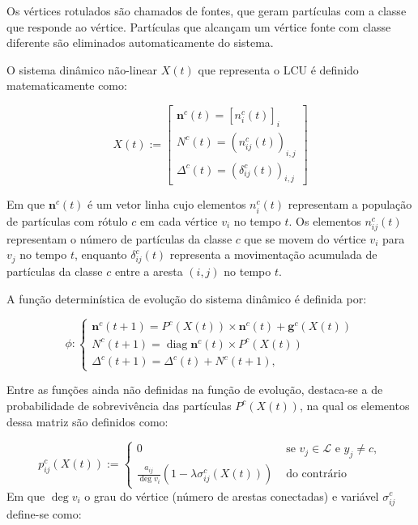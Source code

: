 Os vértices rotulados são chamados de fontes, que geram partículas com
a classe que responde ao vértice. Partículas que alcançam um vértice fonte
com classe diferente são eliminados automaticamente do sistema.

O sistema dinâmico não-linear $X(t)$ que representa o \gls{LCU} é definido
matematicamente como:

\begin{equation}\label{eq:lcu-x}
  X(t):=\left[\begin{array}{c}
    \mathbf{n}^c(t)={\left[n_i^c(t)\right]}_i \\
    N^c(t)={\left(n_{i j}^c(t)\right)}_{i, j} \\
    \Delta^c(t)={\left(\delta_{i j}^c(t)\right)}_{i, j}
\end{array}\right]
\end{equation}

\noindent
Em que $ \mathbf{n}^c(t)$ é um vetor linha cujo elementos $n_i^c(t)$
representam a população de partículas com rótulo $c$ em cada vértice
$v_i$ no tempo $t$. Os elementos $n_{i j}^c(t)$ representam o número
de partículas da classe $c$ que se movem do vértice $v_i$ para $v_j$ no
tempo $ t $, enquanto $\delta_{i j}^c(t)$ representa a movimentação
acumulada de partículas da classe $c$ entre a aresta $(i, j)$ no tempo
$t$.

A função determinística de evolução do sistema dinâmico é definida
por:

\begin{equation}\label{eq:lcu-phi-evolution}
  \phi:\left\{\begin{array}{l}
    \mathbf{n}^c(t+1)= P^c(X(t)) \times \mathbf{n}^c(t) +\mathbf{g}^c(X(t)) \\
    N^c(t+1)=\operatorname{diag} \mathbf{n}^c(t) \times P^c(X(t)) \\
    \Delta^c(t+1)=\Delta^c(t)+N^c(t+1),
  \end{array}\right.
\end{equation}

Entre as funções ainda não definidas na função de evolução, destaca-se a de
probabilidade de sobrevivência das partículas $P^c(X(t))$, na qual os
elementos dessa matriz são definidos como:

\begin{equation} \label{eq:lcu-probability}
  p_{i j}^c(X(t)):= \begin{cases}0 & \text { se } v_j \in \mathcal{L} \text { e
                                     } y_j \neq c, \\
    \frac{a_{i j}}{\deg v_i}\left(1-\lambda \sigma_{i
    j}^c(X(t))\right) & \text { do contrário }\end{cases}
\end{equation}
\noindent
Em que ${\deg v_i}$ o grau do vértice (número de arestas
conectadas) e variável $\sigma_{i j}^c$ define-se como:

